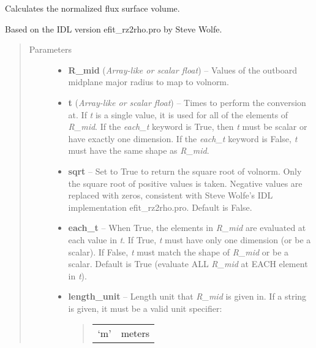 \documentclass[letterpaper,10pt,english]{sphinxmanual}
\begin{document}
\begin{fulllineitems}
\begin{fulllineitems}
\end{fulllineitems}


\begin{fulllineitems}
\label{eqtools:eqtools.core.Equilibrium.rmid2volnorm}
Calculates the normalized flux surface volume.

Based on the IDL version efit\_rz2rho.pro by Steve Wolfe.
\begin{quote}\begin{description}
\item[{Parameters}] \leavevmode\begin{itemize}
\item {} 
\textbf{R\_mid} (\emph{Array-like or scalar float}) -- Values of the outboard midplane
major radius to map to volnorm.

\item {} 
\textbf{t} (\emph{Array-like or scalar float}) -- Times to perform the conversion at.
If \emph{t} is a single value, it is used for all of the elements of
\emph{R\_mid}. If the \emph{each\_t} keyword is True, then \emph{t} must be scalar
or have exactly one dimension. If the \emph{each\_t} keyword is False,
\emph{t} must have the same shape as \emph{R\_mid}.

\item {} 
\textbf{sqrt} -- Set to True to return the square root of volnorm.
Only the square root of positive values is taken. Negative
values are replaced with zeros, consistent with Steve Wolfe's
IDL implementation efit\_rz2rho.pro. Default is False.

\item {} 
\textbf{each\_t} -- When True, the elements in \emph{R\_mid} are evaluated
at each value in \emph{t}. If True, \emph{t} must have only one dimension
(or be a scalar). If False, \emph{t} must match the shape of \emph{R\_mid}
or be a scalar. Default is True (evaluate ALL \emph{R\_mid} at EACH
element in \emph{t}).

\item {} 
\textbf{length\_unit} -- 
Length unit that \emph{R\_mid} is given in.
If a string is given, it must be a valid unit specifier:
\begin{quote}

\begin{tabulary}{\linewidth}{|L|L|}
\hline

`m'
 & 
meters
\\


\end{tabulary}
\end{quote}
\end{itemize}
\end{description}
\end{quote}
\end{fulllineitems}
\end{fulllineitems}
\end{document}
